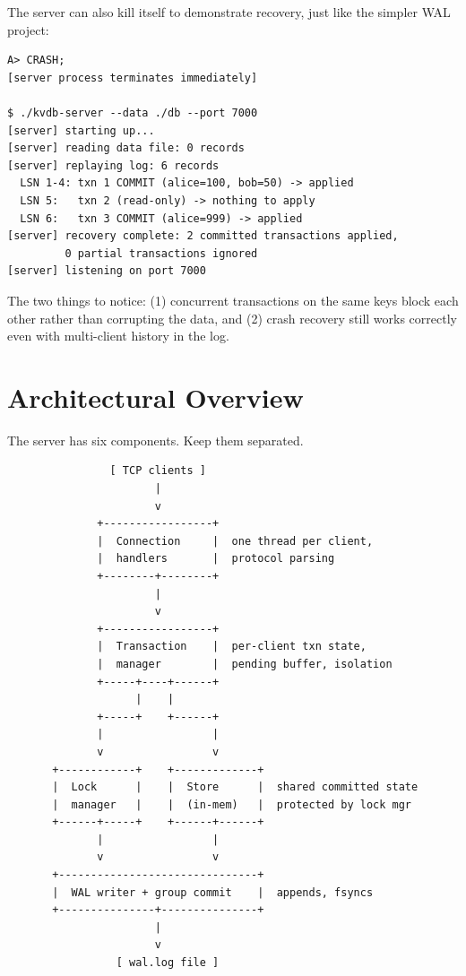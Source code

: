 \documentclass[11pt,a4paper]{article}
\begin{document}
The server can also kill itself to demonstrate recovery, just like the simpler WAL project:

\begin{codebox}
\begin{lstlisting}
A> CRASH;
[server process terminates immediately]

$ ./kvdb-server --data ./db --port 7000
[server] starting up...
[server] reading data file: 0 records
[server] replaying log: 6 records
  LSN 1-4: txn 1 COMMIT (alice=100, bob=50) -> applied
  LSN 5:   txn 2 (read-only) -> nothing to apply
  LSN 6:   txn 3 COMMIT (alice=999) -> applied
[server] recovery complete: 2 committed transactions applied,
         0 partial transactions ignored
[server] listening on port 7000
\end{lstlisting}
\end{codebox}

The two things to notice: (1) concurrent transactions on the same keys block each other rather than corrupting the data, and (2) crash recovery still works correctly even with multi-client history in the log.

\section{Architectural Overview}

The server has six components. Keep them separated.

\begin{codebox}
\begin{lstlisting}
                [ TCP clients ]
                       |
                       v
              +-----------------+
              |  Connection     |  one thread per client,
              |  handlers       |  protocol parsing
              +--------+--------+
                       |
                       v
              +-----------------+
              |  Transaction    |  per-client txn state,
              |  manager        |  pending buffer, isolation
              +-----+----+------+
                    |    |
              +-----+    +------+
              |                 |
              v                 v
       +------------+    +-------------+
       |  Lock      |    |  Store      |  shared committed state
       |  manager   |    |  (in-mem)   |  protected by lock mgr
       +------+-----+    +------+------+
              |                 |
              v                 v
       +-------------------------------+
       |  WAL writer + group commit    |  appends, fsyncs
       +---------------+---------------+
                       |
                       v
                 [ wal.log file ]
\end{lstlisting}
\end{codebox}
\end{document}
